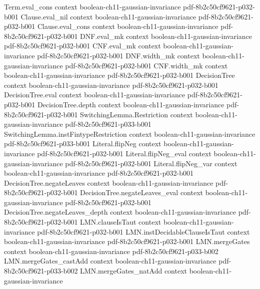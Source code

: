 \begin{lemma}
\proofstep
  {Term.eval_cons}
  {context}
  {boolean-ch11-gaussian-invariance}
  {pdf-8b2c50cf9621-p032-b001}
\proofstep
  {Clause.eval_nil}
  {context}
  {boolean-ch11-gaussian-invariance}
  {pdf-8b2c50cf9621-p032-b001}
\proofstep
  {Clause.eval_cons}
  {context}
  {boolean-ch11-gaussian-invariance}
  {pdf-8b2c50cf9621-p032-b001}
\proofstep
  {DNF.eval_mk}
  {context}
  {boolean-ch11-gaussian-invariance}
  {pdf-8b2c50cf9621-p032-b001}
\proofstep
  {CNF.eval_mk}
  {context}
  {boolean-ch11-gaussian-invariance}
  {pdf-8b2c50cf9621-p032-b001}
\proofstep
  {DNF.width_mk}
  {context}
  {boolean-ch11-gaussian-invariance}
  {pdf-8b2c50cf9621-p032-b001}
\proofstep
  {CNF.width_mk}
  {context}
  {boolean-ch11-gaussian-invariance}
  {pdf-8b2c50cf9621-p032-b001}
\proofstep
  {DecisionTree}
  {context}
  {boolean-ch11-gaussian-invariance}
  {pdf-8b2c50cf9621-p032-b001}
\proofstep
  {DecisionTree.eval}
  {context}
  {boolean-ch11-gaussian-invariance}
  {pdf-8b2c50cf9621-p032-b001}
\proofstep
  {DecisionTree.depth}
  {context}
  {boolean-ch11-gaussian-invariance}
  {pdf-8b2c50cf9621-p032-b001}
\proofstep
  {SwitchingLemma.Restriction}
  {context}
  {boolean-ch11-gaussian-invariance}
  {pdf-8b2c50cf9621-p033-b001}
\proofstep
  {SwitchingLemma.instFintypeRestriction}
  {context}
  {boolean-ch11-gaussian-invariance}
  {pdf-8b2c50cf9621-p033-b001}
\proofstep
  {Literal.flipNeg}
  {context}
  {boolean-ch11-gaussian-invariance}
  {pdf-8b2c50cf9621-p032-b001}
\proofstep
  {Literal.flipNeg_eval}
  {context}
  {boolean-ch11-gaussian-invariance}
  {pdf-8b2c50cf9621-p032-b001}
\proofstep
  {Literal.flipNeg_var}
  {context}
  {boolean-ch11-gaussian-invariance}
  {pdf-8b2c50cf9621-p032-b001}
\proofstep
  {DecisionTree.negateLeaves}
  {context}
  {boolean-ch11-gaussian-invariance}
  {pdf-8b2c50cf9621-p032-b001}
\proofstep
  {DecisionTree.negateLeaves_eval}
  {context}
  {boolean-ch11-gaussian-invariance}
  {pdf-8b2c50cf9621-p032-b001}
\proofstep
  {DecisionTree.negateLeaves_depth}
  {context}
  {boolean-ch11-gaussian-invariance}
  {pdf-8b2c50cf9621-p032-b001}
\proofstep
  {LMN.clauseIsTaut}
  {context}
  {boolean-ch11-gaussian-invariance}
  {pdf-8b2c50cf9621-p032-b001}
\proofstep
  {LMN.instDecidableClauseIsTaut}
  {context}
  {boolean-ch11-gaussian-invariance}
  {pdf-8b2c50cf9621-p032-b001}
\proofstep
  {LMN.mergeGates}
  {context}
  {boolean-ch11-gaussian-invariance}
  {pdf-8b2c50cf9621-p033-b002}
\proofstep
  {LMN.mergeGates_castAdd}
  {context}
  {boolean-ch11-gaussian-invariance}
  {pdf-8b2c50cf9621-p033-b002}
\proofstep
  {LMN.mergeGates_natAdd}
  {context}
  {boolean-ch11-gaussian-invariance}

\end{lemma}
